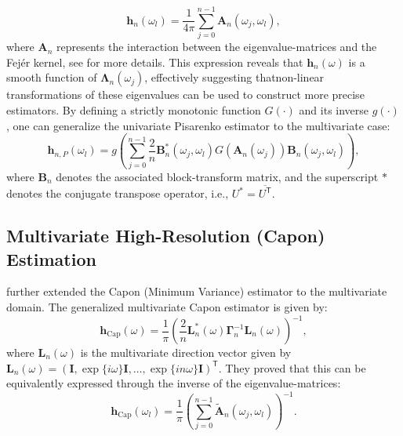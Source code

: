 \documentclass[twoside]{article}
\begin{document}
\begin{equation}
\mathbf{h}_n(\omega_l) = \frac{1}{4\pi} \sum_{j=0}^{n-1} \mathbf{A}_n(\omega_j, \omega_l),
\end{equation}
where $\mathbf{A}_n$ represents the interaction between the eigenvalue-matrices and the Fejér kernel, see \cite{NematollahiSubbaRao:2005} for more details. This expression reveals that $\mathbf{h}_n(\omega)$ is a smooth function of $\mathbf{\Lambda}_n(\omega_j)$, effectively suggesting thatnon-linear transformations of these eigenvalues can be used to construct more precise estimators. By defining a strictly monotonic function $G(\cdot)$ and its inverse $g(\cdot)$, one can generalize the univariate Pisarenko estimator to the multivariate case:
\begin{equation}
\mathbf{h}_{n,P}(\omega_l) = g\left( \sum_{j=0}^{n-1} \frac{2}{n} \mathbf{B}_n^*(\omega_j, \omega_l) G(\mathbf{A}_n(\omega_j)) \mathbf{B}_n(\omega_j, \omega_l) \right),\end{equation}
where $\mathbf{B}_n$ denotes the associated block-transform matrix, and the superscript $*$ denotes the conjugate transpose operator, i.e., $U^* = \overline{U^{\mathsf{T}}}$.



\subsection{Multivariate High-Resolution (Capon) Estimation}



\cite{NematollahiSubbaRao:2005} further extended the Capon (Minimum Variance) estimator to the multivariate domain. The generalized multivariate Capon estimator is given by:
\begin{equation}
\mathbf{h}_{\mathrm{Cap}}(\omega) = \frac{1}{\pi} \left( \frac{2}{n} \mathbf{L}_n^*(\omega) \mathbf{\Gamma}_n^{-1} \mathbf{L}_n(\omega) \right)^{-1},
\end{equation}
where $\mathbf{L}_n(\omega)$ is the multivariate direction vector given by $\mathbf{L}_n(\omega) = (\mathbf{I}, \exp\{i\omega\}\mathbf{I}, \ldots, \exp\{i n \omega\}\mathbf{I})^\mathsf{T}$. They proved that this can be equivalently expressed through the inverse of the eigenvalue-matrices:
\begin{equation}
\mathbf{h}_{\mathrm{Cap}}(\omega_l) = \frac{1}{\pi} \left( \sum_{j=0}^{n-1} \widetilde{\mathbf{A}}_n(\omega_j, \omega_l) \right)^{-1}.
\end{equation}
\end{document}
